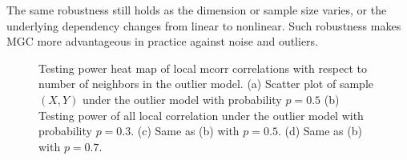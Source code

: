 \documentclass[11pt]{article}
\begin{document}
The same robustness still holds as the dimension or sample size varies, or the underlying dependency changes from linear to nonlinear. Such robustness makes MGC more advantageous in practice against noise and outliers. 

\begin{figure}[htbp]
\hfil
{}
\hfil
{}
\hfil
{}
\caption{Testing power heat map of local mcorr correlations with respect to number of neighbors in the outlier model.
(a) Scatter plot of sample $(X,Y)$ under the outlier model with probability $p=0.5$
(b) Testing power of all local correlation under the outlier model with probability $p=0.3$.
(c) Same as (b) with $p=0.5$.
(d) Same as (b) with $p=0.7$.
}
\label{figSim3}
\end{figure}
\end{document}

